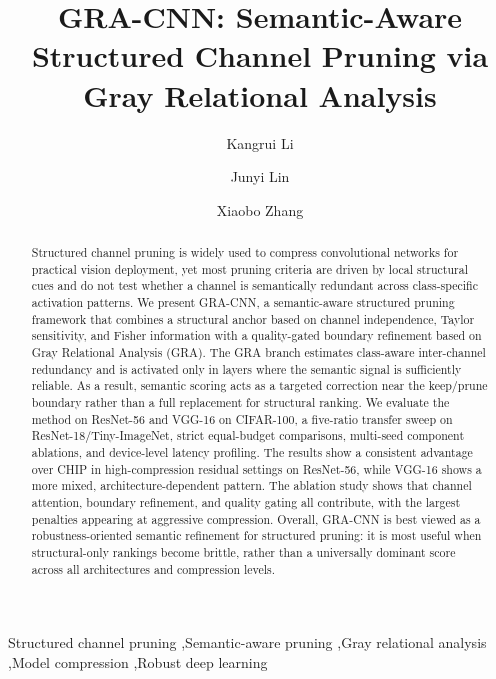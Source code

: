\documentclass[preprint,12pt]{elsarticle}
\begin{document}
\begin{frontmatter}

\title{GRA-CNN: Semantic-Aware Structured Channel Pruning via Gray Relational Analysis}

\author[label1]{Kangrui Li}
\author[label1]{Junyi Lin}
\author[label1]{Xiaobo Zhang}


\begin{abstract}
Structured channel pruning is widely used to compress convolutional networks for practical vision deployment, yet most pruning criteria are driven by local structural cues and do not test whether a channel is semantically redundant across class-specific activation patterns. We present GRA-CNN, a semantic-aware structured pruning framework that combines a structural anchor based on channel independence, Taylor sensitivity, and Fisher information with a quality-gated boundary refinement based on Gray Relational Analysis (GRA). The GRA branch estimates class-aware inter-channel redundancy and is activated only in layers where the semantic signal is sufficiently reliable. As a result, semantic scoring acts as a targeted correction near the keep/prune boundary rather than a full replacement for structural ranking. We evaluate the method on ResNet-56 and VGG-16 on CIFAR-100, a five-ratio transfer sweep on ResNet-18/Tiny-ImageNet, strict equal-budget comparisons, multi-seed component ablations, and device-level latency profiling. The results show a consistent advantage over CHIP in high-compression residual settings on ResNet-56, while VGG-16 shows a more mixed, architecture-dependent pattern. The ablation study shows that channel attention, boundary refinement, and quality gating all contribute, with the largest penalties appearing at aggressive compression. Overall, GRA-CNN is best viewed as a robustness-oriented semantic refinement for structured pruning: it is most useful when structural-only rankings become brittle, rather than a universally dominant score across all architectures and compression levels.
\end{abstract}

\begin{keyword}
Structured channel pruning \sep Semantic-aware pruning \sep Gray relational analysis \sep Model compression \sep Robust deep learning
\end{keyword}

\end{frontmatter}
\end{document}
